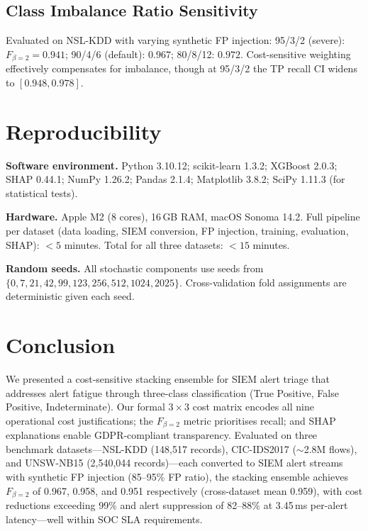 \documentclass[conference]{IEEEtran}
\begin{document}
\subsection{Class Imbalance Ratio Sensitivity}
Evaluated on NSL-KDD with varying synthetic FP injection:
95/3/2 (severe): $F_{\beta=2}=0.941$;
90/4/6 (default): $0.967$;
80/8/12: $0.972$.
Cost-sensitive weighting effectively compensates for imbalance, though at 95/3/2 the TP
recall CI widens to $[0.948, 0.978]$.

\section{Reproducibility}
\label{sec:reproducibility}

\textbf{Software environment.}
Python 3.10.12; scikit-learn 1.3.2; XGBoost 2.0.3; SHAP 0.44.1; NumPy 1.26.2;
Pandas 2.1.4; Matplotlib 3.8.2; SciPy 1.11.3 (for statistical tests).

\textbf{Hardware.}
Apple M2 (8 cores), 16\,GB RAM, macOS Sonoma 14.2.
Full pipeline per dataset (data loading, SIEM conversion, FP injection, training,
evaluation, SHAP): $<5$ minutes.  Total for all three datasets: $<15$ minutes.

\textbf{Random seeds.}
All stochastic components use seeds from
$\{0, 7, 21, 42, 99, 123, 256, 512, 1024, 2025\}$.
Cross-validation fold assignments are deterministic given each seed.

\section{Conclusion}
\label{sec:conclusion}

We presented a cost-sensitive stacking ensemble for SIEM alert triage that addresses
alert fatigue through three-class classification (True Positive, False Positive, Indeterminate).
Our formal $3\times3$ cost matrix encodes all nine operational cost justifications;
the $F_{\beta=2}$ metric prioritises recall; and SHAP explanations enable GDPR-compliant
transparency.
Evaluated on three benchmark datasets---NSL-KDD (148,517 records),
CIC-IDS2017 ($\sim$2.8M flows), and UNSW-NB15 (2,540,044 records)---each converted to
SIEM alert streams with synthetic FP injection (85--95\% FP ratio), the stacking ensemble
achieves $F_{\beta=2}$ of 0.967, 0.958, and 0.951 respectively (cross-dataset mean 0.959),
with cost reductions exceeding 99\% and alert suppression of 82--88\% at 3.45\,ms per-alert
latency---well within SOC SLA requirements.
\end{document}
